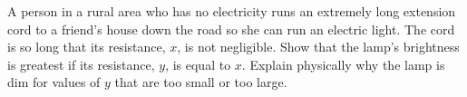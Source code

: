         A person in a rural area who has no electricity runs
        an extremely long extension cord to a friend's house down
        the road so she can run an electric light. The cord is so
        long that its resistance, $x$, is not negligible. Show that
        the lamp's brightness is greatest if its resistance, $y$, is
        equal to $x$. Explain physically why the lamp is dim for
        values of $y$ that are too small or too large.
